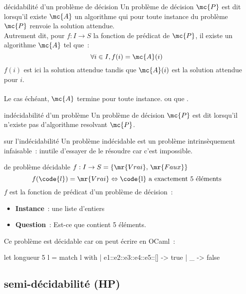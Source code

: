 \begin{definition}{}{décidabilité d'un problème de décision}
    Un problème de décision $\mc{P}$ est dit  lorsqu'il existe $\mc{A}$ un algorithme qui pour toute instance du problème $\mc{P}$ renvoie la solution attendue.\\
    Autrement dit, pour $f : I \to S$ la fonction de prédicat de $\mc{P}$, il existe un algorithme $\mc{A}$ tel que~:
    $$\forall i \in I, f(i) = \mc{A}(i)$$
    $f(i)$ est ici la solution attendue tandis que $\mc{A}(i)$ est la solution attendue pour $i$.\\\\
    Le cas échéant, $\mc{A}$ termine pour toute instance.
     ou que .
\end{definition}

\begin{definition}{}{indécidabilité d'un problème}
    Un problème de décision $\mc{P}$ est dit  lorsqu'il n'existe pas d'algorithme resolvant $\mc{P}$.
\end{definition}

\begin{remarque}{}{sur l'indécidabilité}
    Un problème indécidable est un problème intrinsèquement infaisable~: inutile d'essayer de le résoudre car c'est impossible.
\end{remarque}

\begin{exemple}{}{de problème décidable}
    $f : I \to S = \{\mr{Vrai},\, \mr{Faux}\}$\\
    $$f(\code{l}) = \mr{Vrai} \Leftrightarrow \text{\code{l} a exactement 5 éléments}$$
    $f$ est la fonction de prédicat d'un problème de décision~:
    \begin{itemize}
        \item \textbf{Instance}~:  une liste d'entiers
        \item \textbf{Question}~: Est-ce que  contient 5 éléments.
    \end{itemize}
    Ce problème est décidable car on peut écrire en OCaml~:
    \begin{lstOCaml}
    let longueur 5 l =
        match l with
        | e1::e2::e3::e4::e5::[] -> true
        | _ -> false
    \end{lstOCaml}
\end{exemple}

\subsection{semi-décidabilité (HP)}

